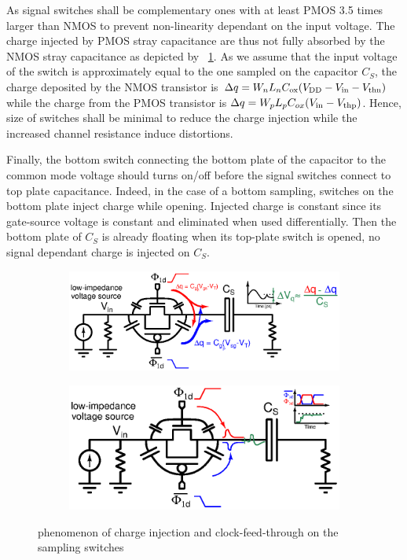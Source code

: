As signal switches shall be complementary ones with at least PMOS 3.5 times larger than NMOS to prevent non-linearity dependant on the input voltage. The charge injected by PMOS stray capacitance are thus not fully absorbed by the NMOS stray capacitance as depicted by \figurename~\ref{fig:charge-injection-switches}. As we assume that the input voltage of the switch is approximately equal to the one sampled on the capacitor \(C_S\), the charge deposited by the NMOS transistor is \(\Delta q = W_nL_nC_{\rm ox}(V_{\rm DD}-V_{\rm in}-V_{\rm thn}) \) while the charge from the PMOS transistor is \(\Delta q = W_pL_pC_{ox}(V_{\rm in}-V_{\rm thp}) \). Hence, size of switches shall be minimal to reduce the charge injection while the increased channel resistance induce distortions.

Finally, the bottom switch connecting the bottom plate of the capacitor to the common mode voltage should turns on/off before the signal switches connect to top plate capacitance. Indeed, in the case of a bottom sampling, switches on the bottom plate inject charge while opening. Injected charge is constant since its gate-source voltage is constant and eliminated when used differentially. Then the bottom plate of \(C_S\) is already floating when its top-plate switch is opened, no signal dependant charge is injected on \(C_S\).

\begin{figure}[htp]
	\centering
	\begin{subfigure}[b]{0.52\textwidth}
		\centering
		\includegraphics[width=\textwidth]{Chapter4/Figs/charge-injection.ps}
		\label{fig:charge-injection-switches}
	\end{subfigure}
	\begin{subfigure}[b]{0.46\textwidth}
		\centering
		\includegraphics[width=\textwidth]{Chapter4/Figs/clock-feedthrough.ps}
		\label{fig:clock-feedthrough-switches}
	\end{subfigure}
	\caption{phenomenon of charge injection and clock-feed-through on the sampling switches}
	\label{fig:sample-switches-error-source}
\end{figure}


